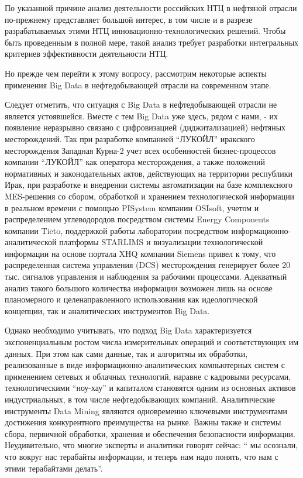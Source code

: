 По указанной причине анализ деятельности российских НТЦ в нефтяной отрасли по-прежнему представляет большой интерес, в том числе и в разрезе разрабатываемых этими НТЦ инновационно-технологических решений.
Чтобы быть проведенным в полной мере, такой анализ требует разработки интегральных критериев эффективности деятельности НТЦ.

Но прежде чем перейти к этому вопросу, рассмотрим некоторые аспекты применения Big Data в нефтедобывающей отрасли на современном этапе.

Следует отметить, что ситуация с Big Data в нефтедобывающей отрасли не является устоявшейся.
Вместе с тем Big Data уже здесь, рядом с нами, - их появление неразрывно связано с цифровизацией (диджитализацией) нефтяных месторождений.
Так при разработке компанией ``ЛУКОЙЛ'' иракского месторождения Западная Курна-2 учет всех особенностей бизнес-процессов компании ``ЛУКОЙЛ'' как оператора месторождения, а также положений нормативных и законодательных актов, действующих на территории республики Ирак, при разработке и внедрении системы автоматизации на базе комплексного MES-решения со сбором, обработкой и хранением технологической информации в реальном времени с помощью PISystem компании OSIsoft, учетом и распределением углеводородов посредством системы Energy Components компании Tieto, поддержкой работы лаборатории посредством информационно-аналитической платформы STARLIMS и визуализации технологической информации на основе портала XHQ компании Siemens привел к тому, что распределенная система управления (DCS) месторождения генерирует более 20 тыс.
сигналов управления и наблюдения за рабочими процессами.
Адекватный анализ такого большого количества информации возможен лишь на основе планомерного и целенаправленного использования как идеологической концепции, так и аналитических инструментов Big Data.

Однако необходимо учитывать, что подход Big Data характеризуется экспоненциальным ростом числа измерительных операций и соответствующих им данных.
При этом как сами данные, так и алгоритмы их обработки, реализованные в виде информационно-аналитических компьютерных систем с применением сетевых и облачных технологий, наравне с кадровыми ресурсами, технологическими ``ноу-хау'' и капиталом становятся одним из основных активов индустриальных, в том числе нефтедобывающих компаний.
Аналитические инструменты Data Mining являются одновременно ключевыми инструментами достижения конкурентного преимущества на рынке.
Важны также и системы сбора, первичной обработки, хранения и обеспечения безопасности информации.
Неудивительно, что многие эксперты и аналитики говорят сейчас: `` мы осознали, что вокруг нас терабайты информации, и теперь нам надо понять, что нам с этими терабайтами делать''.

